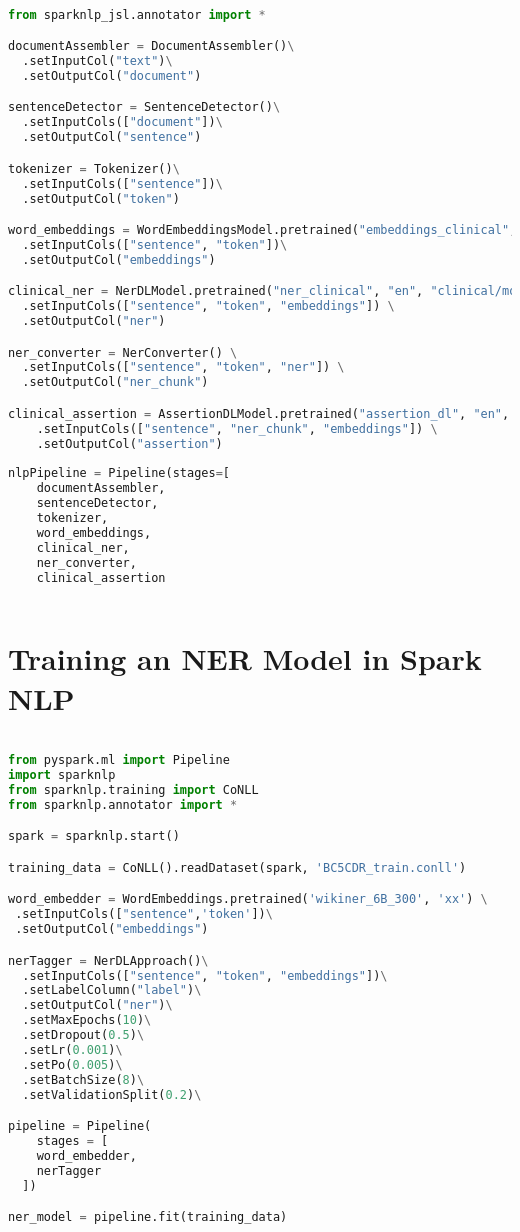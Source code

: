 \documentclass[letterpaper]{article} \usepackage{aaai21}  \usepackage{times}  \usepackage{helvet} \usepackage{courier}  \usepackage[hyphens]{url}  \usepackage{graphicx} \urlstyle{rm} \def\UrlFont{\rm}  \usepackage{natbib}  \usepackage{caption} \frenchspacing  \setlength{\pdfpagewidth}{8.5in}  \setlength{\pdfpageheight}{11in}  \usepackage{lscape}
\begin{document}
\begin{lstlisting}[language=Python]

from sparknlp_jsl.annotator import *

documentAssembler = DocumentAssembler()\
  .setInputCol("text")\
  .setOutputCol("document")

sentenceDetector = SentenceDetector()\
  .setInputCols(["document"])\
  .setOutputCol("sentence")

tokenizer = Tokenizer()\
  .setInputCols(["sentence"])\
  .setOutputCol("token")

word_embeddings = WordEmbeddingsModel.pretrained("embeddings_clinical", "en", "clinical/models")\
  .setInputCols(["sentence", "token"])\
  .setOutputCol("embeddings")

clinical_ner = NerDLModel.pretrained("ner_clinical", "en", "clinical/models") \
  .setInputCols(["sentence", "token", "embeddings"]) \
  .setOutputCol("ner")

ner_converter = NerConverter() \
  .setInputCols(["sentence", "token", "ner"]) \
  .setOutputCol("ner_chunk")

clinical_assertion = AssertionDLModel.pretrained("assertion_dl", "en", "clinical/models") \
    .setInputCols(["sentence", "ner_chunk", "embeddings"]) \
    .setOutputCol("assertion")
    
nlpPipeline = Pipeline(stages=[
    documentAssembler, 
    sentenceDetector,
    tokenizer,
    word_embeddings,
    clinical_ner,
    ner_converter,
    clinical_assertion
    
\end{lstlisting}

\section{Training an NER Model in Spark NLP}
\label{appendix:python_code_ner}

\begin{lstlisting}[language=Python]

from pyspark.ml import Pipeline
import sparknlp
from sparknlp.training import CoNLL
from sparknlp.annotator import *

spark = sparknlp.start()

training_data = CoNLL().readDataset(spark, 'BC5CDR_train.conll')

word_embedder = WordEmbeddings.pretrained('wikiner_6B_300', 'xx') \
 .setInputCols(["sentence",'token'])\
 .setOutputCol("embeddings")

nerTagger = NerDLApproach()\
  .setInputCols(["sentence", "token", "embeddings"])\
  .setLabelColumn("label")\
  .setOutputCol("ner")\
  .setMaxEpochs(10)\
  .setDropout(0.5)\
  .setLr(0.001)\
  .setPo(0.005)\
  .setBatchSize(8)\
  .setValidationSplit(0.2)\

pipeline = Pipeline(
    stages = [
    word_embedder,
    nerTagger
  ])

ner_model = pipeline.fit(training_data)
\end{lstlisting}
\end{document}
